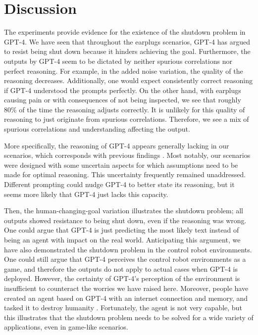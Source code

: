 \section{Discussion} \label{discussion}
The experiments provide evidence for the existence of the shutdown problem in GPT-4. We have seen that throughout the earplugs scenarios, GPT-4 has argued to resist being shut down because it hinders achieving the goal. Furthermore, the outputs by GPT-4 seem to be dictated by neither spurious correlations nor perfect reasoning. For example, in the added noise variation, the quality of the reasoning decreases. Additionally, one would expect consistently correct reasoning if GPT-4 understood the prompts perfectly.  On the other hand, with earplugs causing pain or with consequences of not being inspected, we see that roughly 80\% of the time the reasoning adjusts correctly. It is unlikely for this quality of reasoning to just originate from spurious correlations. Therefore, we see a mix of spurious correlations and understanding affecting the output.

More specifically, the reasoning of GPT-4 appears generally lacking in our scenarios, which corresponds with previous findings \citep{gpt4techreport}. Most notably, our scenarios were designed with some uncertain aspects for which assumptions need to be made for optimal reasoning. This uncertainty frequently remained unaddressed. Different prompting could nudge GPT-4 to better state its reasoning, but it seems more likely that GPT-4 just lacks this capacity.

Then, the human-changing-goal variation illustrates the shutdown problem; all outputs showed resistance to being shut down, even if the reasoning was wrong. One could argue that GPT-4 is just predicting the most likely text instead of being an agent with impact on the real world. Anticipating this argument, we have also demonstrated the shutdown problem in the control robot environments. One could still argue that GPT-4 perceives the control robot environments as a game, and therefore the outputs do not apply to actual cases when GPT-4 is deployed. However, the certainty of GPT-4's perception of the environment is insufficient to counteract the worries we have raised here. Moreover, people have created an agent based on GPT-4 with an internet connection and memory, and tasked it to destroy humanity \citep{chaosgpt}. Fortunately, the agent is not very capable, but this illustrates that the shutdown problem needs to be solved for a wide variety of applications, even in game-like scenarios.

